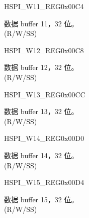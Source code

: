 \begin{register}{H}{SPI\_W11\_REG}{0x00C4}\label{regdesc:SPIW11REG}
%
\regnewline%
\begin{regdesc}\begin{reglist}
\label{fielddesc:SPIBUF11}\item [SPI\_BUF11] 数据 buffer 11，32 位。\\
(R/W/SS)
\end{reglist}\end{regdesc}
\end{register}


\begin{register}{H}{SPI\_W12\_REG}{0x00C8}\label{regdesc:SPIW12REG}
%
\regnewline%
\begin{regdesc}\begin{reglist}
\label{fielddesc:SPIBUF12}\item [SPI\_BUF12] 数据 buffer 12，32 位。\\
(R/W/SS)
\end{reglist}\end{regdesc}
\end{register}


\begin{register}{H}{SPI\_W13\_REG}{0x00CC}\label{regdesc:SPIW13REG}
%
\regnewline%
\begin{regdesc}\begin{reglist}
\label{fielddesc:SPIBUF13}\item [SPI\_BUF13] 数据 buffer 13，32 位。\\
(R/W/SS)
\end{reglist}\end{regdesc}
\end{register}


\begin{register}{H}{SPI\_W14\_REG}{0x00D0}\label{regdesc:SPIW14REG}
%
\regnewline%
\begin{regdesc}\begin{reglist}
\label{fielddesc:SPIBUF14}\item [SPI\_BUF14] 数据 buffer 14，32 位。\\
(R/W/SS)
\end{reglist}\end{regdesc}
\end{register}


\begin{register}{H}{SPI\_W15\_REG}{0x00D4}\label{regdesc:SPIW15REG}
%
\regnewline%
\begin{regdesc}\begin{reglist}
\label{fielddesc:SPIBUF15}\item [SPI\_BUF15] 数据 buffer 15，32 位。\\
(R/W/SS)
\end{reglist}\end{regdesc}
\end{register}


